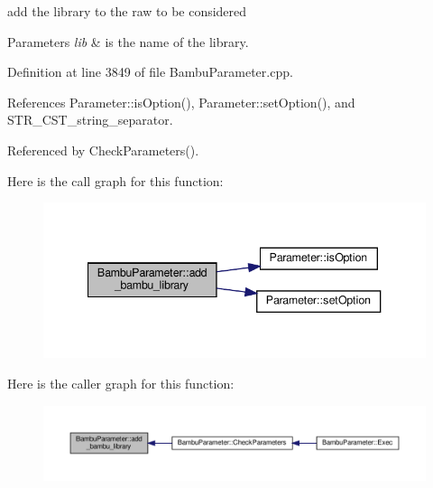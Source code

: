add the library to the raw to be considered 


\begin{DoxyParams}{Parameters}
{\em lib} & is the name of the library. \\
\hline
\end{DoxyParams}


Definition at line 3849 of file Bambu\+Parameter.\+cpp.



References Parameter\+::is\+Option(), Parameter\+::set\+Option(), and S\+T\+R\+\_\+\+C\+S\+T\+\_\+string\+\_\+separator.



Referenced by Check\+Parameters().

Here is the call graph for this function\+:
\nopagebreak
\begin{figure}[H]
\begin{center}
\leavevmode
\includegraphics[width=340pt]{d4/d67/classBambuParameter_a82c89009ec3e4df0e56d530ea3caf470_cgraph}
\end{center}
\end{figure}
Here is the caller graph for this function\+:
\nopagebreak
\begin{figure}[H]
\begin{center}
\leavevmode
\includegraphics[width=350pt]{d4/d67/classBambuParameter_a82c89009ec3e4df0e56d530ea3caf470_icgraph}
\end{center}
\end{figure}
\mbox{\label{classBambuParameter_a28ac4c15cb64b71afc19f96caecd9c26}} 
